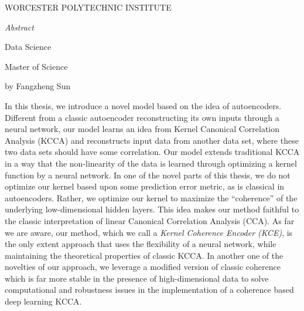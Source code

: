 \documentclass[12pt]{report} %
\begin{document}
\begin{center}
	WORCESTER POLYTECHNIC INSTITUTE\\
	\vspace{1 in}
	\begin{Large}
		\emph{Abstract}\\
	\end{Large}
	\vspace{30 bp}
	\begin{small}
		Data Science\\
	\end{small}
	\vspace{15 bp}
	\begin{small}
		Master of Science\\
	\end{small}
	\vspace{15 bp}
	\begin{small}
		by Fangzheng Sun\\
	\end{small}
\end{center}
In this thesis, we introduce a novel model based on the idea of autoencoders. Different from a classic autoencoder reconstructing its own inputs through a neural network, our model learns an idea from Kernel Canonical Correlation Analysis (KCCA) and reconstructs input data from another data set, where these two data sets should have some correlation. Our model extends traditional KCCA in a way that the non-linearity of the data is learned through optimizing a kernel function by a neural network. In one of the novel parts of this thesis, we do not optimize our kernel based upon some prediction error metric, as is classical in autoencoders. Rather, we optimize our kernel to maximize the ``coherence'' of the underlying low-dimensional hidden layers. This idea makes our method faithful to the classic interpretation of linear Canonical Correlation Analysis (CCA). 
As far we are aware, our method, which we call a \textit{Kernel Coherence Encoder (KCE)},  is the only extent approach that uses the flexibility of a neural network, while maintaining the theoretical properties of classic KCCA. In another one of the novelties of our approach, we leverage a modified version of classic coherence which is far more stable in the presence of high-dimensional data to solve computational and robustness issues in the implementation of a coherence based deep learning KCCA.

\clearpage
\end{document}
